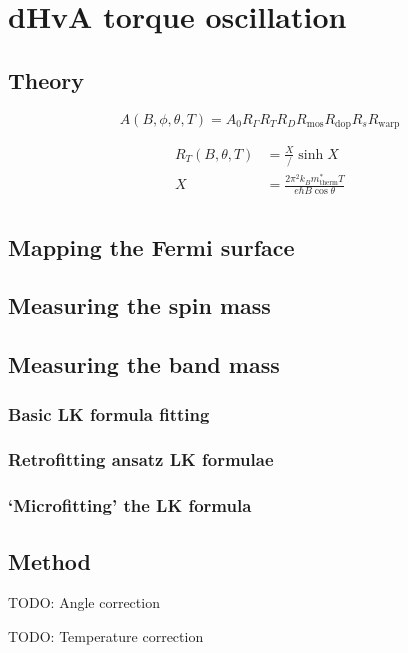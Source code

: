 
\section{dHvA torque oscillation}

\subsection{Theory}

\begin{equation}
A(B,\phi,\theta,T)=A_0R_{\Gamma}R_TR_DR_{\textrm{mos}}R_{\textrm{dop}}R_sR_{\textrm{warp}}
\label{Eqn:2:OscilllationAmp}
\end{equation}

\begin{align}
R_T(B, \theta, T) &= \frac{X}/{\sinh{X}} \\
X                 &= \frac{2\pi^2k_Bm^*_{\textrm{therm}}T}{e\hbar B\cos{\theta}} \\
\label{Eqn:2:TempTermOscillationAmp}
\end{align}

\subsection{Mapping the Fermi surface}

\subsection{Measuring the spin mass}

\subsection{Measuring the band mass}

\subsubsection{Basic LK formula fitting}

\subsubsection{Retrofitting ansatz LK formulae}
\label{Sec:2:LKRetrofitting}

\subsubsection{`Microfitting' the LK formula}
\label{Sec:2:LKMicrofitting}

\subsection{Method}

TODO: Angle correction

TODO: Temperature correction

